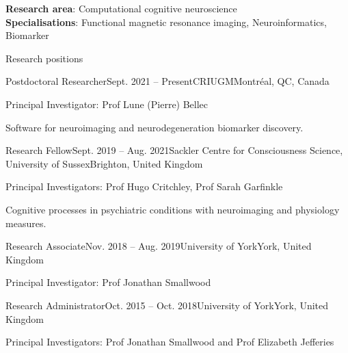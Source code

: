 \documentclass{resume} %
\begin{document}

\textbf{Research area}: 
Computational cognitive neuroscience \\ 
\textbf{Specialisations}: 
Functional magnetic resonance imaging, 
Neuroinformatics,
Biomarker




\begin{rSection}{Research positions}

  \begin{rSubsection}{Postdoctoral Researcher}{Sept. 2021 -- Present}{CRIUGM}{Montr\'eal, QC, Canada}
    \item Principal Investigator: Prof Lune (Pierre) Bellec
    \item Software for neuroimaging and neurodegeneration biomarker discovery.
  \end{rSubsection}

  \begin{rSubsection}{Research Fellow}{Sept. 2019 -- Aug. 2021}{Sackler Centre for Consciousness Science, University of Sussex}{Brighton, United Kingdom}
    \item Principal Investigators: Prof Hugo Critchley, Prof Sarah Garfinkle
    \item Cognitive processes in psychiatric conditions with neuroimaging and physiology measures.
  \end{rSubsection}

  \begin{rSubsection}{Research Associate}{Nov. 2018 -- Aug. 2019}{University of York}{York, United Kingdom}
  \item Principal Investigator: Prof Jonathan Smallwood
  \end{rSubsection}

  \begin{rSubsection}{Research Administrator}{Oct. 2015 -- Oct. 2018}{University of York}{York, United Kingdom}
    \item Principal Investigators: Prof Jonathan Smallwood and Prof Elizabeth Jefferies
  \end{rSubsection}

  \end{rSection}
\end{document}
